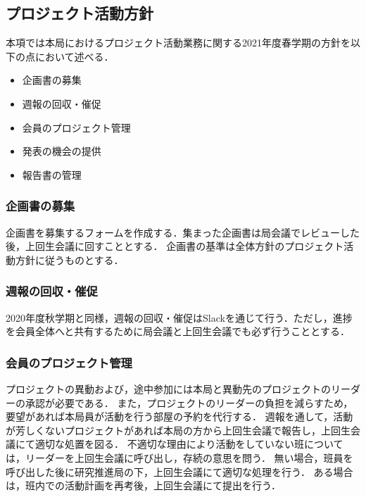 \subsection*{プロジェクト活動方針}


本項では本局におけるプロジェクト活動業務に関する2021年度春学期の方針を以下の点において述べる．

\begin{itemize}
\item 企画書の募集
\item 週報の回収・催促
\item 会員のプロジェクト管理
\item 発表の機会の提供
\item 報告書の管理
\end{itemize}

\subsubsection*{企画書の募集}

企画書を募集するフォームを作成する．集まった企画書は局会議でレビューした後，上回生会議に回すこととする．
企画書の基準は全体方針のプロジェクト活動方針に従うものとする．

\subsubsection*{週報の回収・催促}

2020年度秋学期と同様，週報の回収・催促はSlackを通じて行う．ただし，進捗を会員全体へと共有するために局会議と上回生会議でも必ず行うこととする．

\subsubsection*{会員のプロジェクト管理}

プロジェクトの異動および，途中参加には本局と異動先のプロジェクトのリーダーの承認が必要である．
また，プロジェクトのリーダーの負担を減らすため，要望があれば本局員が活動を行う部屋の予約を代行する．
週報を通して，活動が芳しくないプロジェクトがあれば本局の方から上回生会議で報告し，上回生会議にて適切な処置を図る．
不適切な理由により活動をしていない班については，リーダーを上回生会議に呼び出し，存続の意思を問う．
無い場合，班員を呼び出した後に研究推進局の下，上回生会議にて適切な処理を行う．
ある場合は，班内での活動計画を再考後，上回生会議にて提出を行う．

